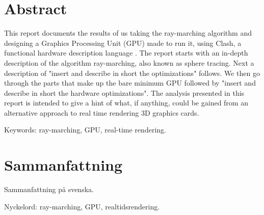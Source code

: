 \thispagestyle{plain}			%
\setlength{\parskip}{0pt plus 1.0pt}
\section*{Abstract}

	This report documents the results of us taking the ray-marching algorithm
	and designing a Graphics Processing Unit (GPU) made to run it, using Clash, 
	a functional hardware description language .\cite{Raa2015a} The report 
	starts with an in-depth description of the algorithm ray-marching, also 
	known as sphere tracing. Next a description of "insert and describe in short
	the optimizations" follows. We then go through the parts that make up the 
	bare minimum GPU followed by "insert and describe in short the hardware 
	optimizations". The analysis presented in this report is intended to give 
	a hint of what,	if anything, could be gained from an alternative approach 
	to real time rendering 3D graphics cards.

	\vfill
	Keywords: ray-marching, GPU, real-time rendering.

\newpage
\thispagestyle{plain}

\section*{Sammanfattning}
	
	Sammanfattning på svenska.
	
	\vfill
	Nyckelord: ray-marching, GPU, realtidsrendering.


\newpage
\thispagestyle{empty}
\mbox{}
